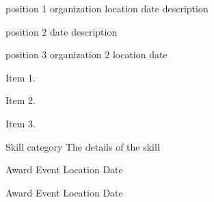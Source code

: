 \begin{cventries}
  \cventry
    {position 1}
    {organization}
    {location}
    {date}
    {description}

  \cvextendentry
    {position 2}
    {date}
    {description}
    
  \cventry
    {position 3}
    {organization 2}
    {location}
    {date}
    {
      \begin{cvitems}
        \item {Item 1.}
        \item {Item 2.}
      \end{cvitems}
			\begin{cvsubentries}
			\end{cvsubentries}
      \begin{cvitems}
        \vspace{5.0mm}
        \item {Item 3.}
      \end{cvitems}
    }
\end{cventries}



\begin{cvskills}

  \cvskill
    {Skill category} %
    {The details of the skill} %
    
\end{cvskills}




\begin{cvhonors}

  \cvhonor
    {Award} %
    {Event} %
    {Location} %
    {Date} %

  \cvhonor
    {Award} %
    {Event} %
    {Location} %
    {Date} %

\end{cvhonors}